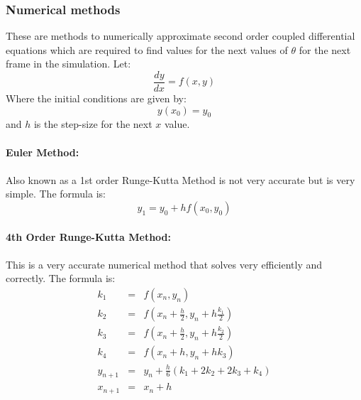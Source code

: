 \documentclass[12pt]{article}
\begin{document}
\newpage
\subsubsection{Numerical methods}
These are methods to numerically approximate second order coupled differential equations which are required to find values for the next values of $\theta$ for the next frame in the simulation. 
Let: 
\begin{equation}
    \frac{dy}{dx} = f(x,y)
\end{equation}
Where the initial conditions are given by:
\begin{equation}
    y(x_0) = y_0
\end{equation}
and $h$ is the step-size for the next $x$ value.

\paragraph{Euler Method\cite{eulerMethod}:} 
\paragraph{}
Also known as a 1st order Runge-Kutta Method is not very accurate but is very simple.
The formula is:
\begin{equation}
    y_1 = y_0 + hf(x_0,y_0)
\end{equation}

\paragraph{4th Order Runge-Kutta Method\cite{rk4Method}:}
\paragraph{}
This is a very accurate numerical method that solves very efficiently and correctly.
The formula is:\begin{eqnarray}
    k_1 &=& f(x_n,y_n) \\
    k_2 &=& f\left(x_n + \frac{h}{2}, y_n + h\frac{k_1}{2}\right) \\
    k_3 &=& f\left(x_n + \frac{h}{2}, y_n + h\frac{k_2}{2}\right) \\
    k_4 &=& f(x_n + h, y_n + hk_3) \\
    y_{n+1} &=& y_n + \frac{h}{6}(k_1 + 2k_2 + 2k_3 + k_4) \\
    x_{n+1} &=& x_n + h
\end{eqnarray}

\newpage
\end{document}
